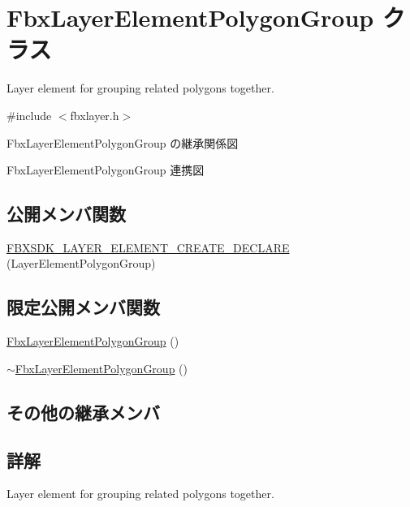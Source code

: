 \hypertarget{class_fbx_layer_element_polygon_group}{}\section{Fbx\+Layer\+Element\+Polygon\+Group クラス}
\label{class_fbx_layer_element_polygon_group}


Layer element for grouping related polygons together.  




{\ttfamily \#include $<$fbxlayer.\+h$>$}



Fbx\+Layer\+Element\+Polygon\+Group の継承関係図


Fbx\+Layer\+Element\+Polygon\+Group 連携図
\subsection*{公開メンバ関数}
\begin{DoxyCompactItemize}
\item 
\hyperlink{class_fbx_layer_element_polygon_group_a604999a25c284efdfe88b784b468604e}{F\+B\+X\+S\+D\+K\+\_\+\+L\+A\+Y\+E\+R\+\_\+\+E\+L\+E\+M\+E\+N\+T\+\_\+\+C\+R\+E\+A\+T\+E\+\_\+\+D\+E\+C\+L\+A\+RE} (Layer\+Element\+Polygon\+Group)
\end{DoxyCompactItemize}
\subsection*{限定公開メンバ関数}
\begin{DoxyCompactItemize}
\item 
\hyperlink{class_fbx_layer_element_polygon_group_a2d46c9bfe9674b49f802b2cabf3b041c}{Fbx\+Layer\+Element\+Polygon\+Group} ()
\item 
\hyperlink{class_fbx_layer_element_polygon_group_a7d1bbdb9134916b62a6f570e3d2e3bcd}{$\sim$\+Fbx\+Layer\+Element\+Polygon\+Group} ()
\end{DoxyCompactItemize}
\subsection*{その他の継承メンバ}


\subsection{詳解}
Layer element for grouping related polygons together. 

